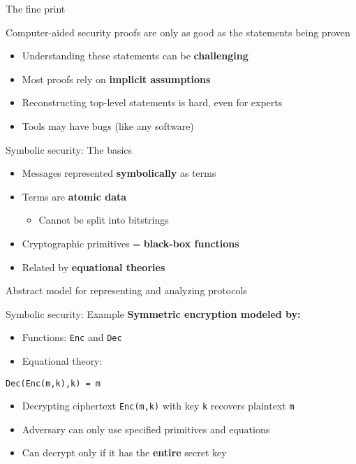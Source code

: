 \documentclass[aspectratio=169, lualatex, handout]{beamer}
\begin{document}
\begin{frame}{The fine print}
	\begin{center}
		\Large
		Computer-aided security proofs are only as good as the statements being proven
	\end{center}
	\vspace{1em}
	\begin{itemize}
		\item Understanding these statements can be \textbf{challenging}
		\item Most proofs rely on \textbf{implicit assumptions}
		\item Reconstructing top-level statements is hard, even for experts
		\item Tools may have bugs (like any software)
	\end{itemize}
\end{frame}

\begin{frame}{Symbolic security: The basics}
	\begin{itemize}
		\item Messages represented \textbf{symbolically} as terms
		\item Terms are \textbf{atomic data}
		      \begin{itemize}
			      \item Cannot be split into bitstrings
		      \end{itemize}
		\item Cryptographic primitives = \textbf{black-box functions}
		\item Related by \textbf{equational theories}
	\end{itemize}
	\vspace{1em}
	\begin{center}
		Abstract model for representing and analyzing protocols
	\end{center}
\end{frame}

\begin{frame}{Symbolic security: Example}
	\textbf{Symmetric encryption modeled by:}
	\begin{itemize}
		\item Functions: \texttt{Enc} and \texttt{Dec}
		\item Equational theory:
	\end{itemize}
	\begin{center}
		\Large
		\texttt{Dec(Enc(m,k),k) = m}
	\end{center}
	\begin{itemize}
		\item Decrypting ciphertext \texttt{Enc(m,k)} with key \texttt{k} recovers plaintext \texttt{m}
		\item Adversary can only use specified primitives and equations
		\item Can decrypt only if it has the \textbf{entire} secret key
	\end{itemize}
\end{frame}
\end{document}
